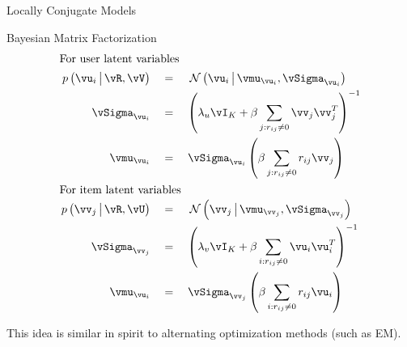 \documentclass{article}
\begin{document}
\begin{ssection}{Locally Conjugate Models}
\begin{ssubsection}{Bayesian Matrix Factorization}
		\begin{align*}
			\shortintertext{For user latent variables}
			\prob{\vu_i \pipe \vR, \vV}		&\eq \ND{\vu_i \pipe \vmu_{\vu_i}, \vSigma_{\vu_i}} \\
			\vSigma_{\vu_i}					&\eq \para{\lambda_u \iden{K} + \beta \sum_{j : r_{ij} \ne 0} \vv_j \vv_j^T}^{-1} \\
			\vmu_{\vu_i}					&\eq \vSigma_{\vu_i} \para{\beta \sum_{j : r_{ij} \ne 0} r_{ij} \vv_j} \\
			\shortintertext{For item latent variables}
			\prob{\vv_j \pipe \vR, \vU}		&\eq \ND{\vv_j \pipe \vmu_{\vv_j}, \vSigma_{\vv_j}} \\
			\vSigma_{\vv_j}					&\eq \para{\lambda_v \iden{K} + \beta \sum_{i : r_{ij} \ne 0} \vu_i \vu_i^T}^{-1} \\
			\vmu_{\vu_i}					&\eq \vSigma_{\vv_j} \para{\beta \sum_{i : r_{ij} \ne 0} r_{ij} \vu_i} \\
		\end{align*} \br%

		This idea is similar in spirit to alternating optimization methods (such as EM). 
		
	\end{ssubsection}
	
\end{ssection}
\end{document}
